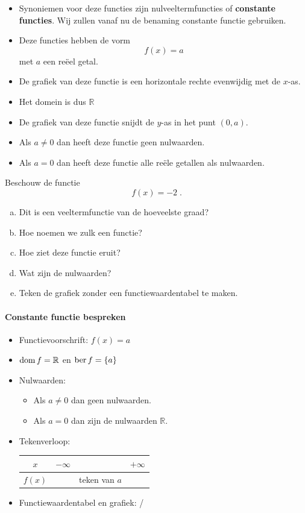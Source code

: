 \documentclass[12pt]{article}
\begin{document}
\begin{itemize}
\item Synoniemen voor deze functies zijn nulveeltermfuncties of {\bf constante functies}. Wij zullen vanaf nu de benaming constante functie gebruiken.
\item Deze functies hebben de vorm
  $$f(x) = a$$
  met $a$ een reëel getal.
\item De grafiek van deze functie is een horizontale rechte evenwijdig met de $x$-as.
\item Het domein is dus $\mathbb{R}$
\item De grafiek van deze functie snijdt de $y$-as in het punt $(0, a)$.
\item Als $a\neq 0$ dan heeft deze functie geen nulwaarden.
\item Als $a=0$ dan heeft deze functie alle reële getallen als nulwaarden.
\end{itemize}



\begin{oefening}
  Beschouw de functie
  $$f(x)=-2\;.$$
  \begin{enumerate}[(a)]
  \item Dit is een veeltermfunctie van de hoeveelste graad?
  \item Hoe noemen we zulk een functie?
  \item Hoe ziet deze functie eruit?
  \item Wat zijn de nulwaarden?
  \item Teken de grafiek zonder een functiewaardentabel te maken.
  \end{enumerate}
\end{oefening}



\paragraph*{Constante functie bespreken}
\begin{mdframed}
  \begin{itemize}
  \item Functievoorschrift: $f(x)=a$
  \item $\dom f = \mathbb{R}$ en $\ber f = \{a\}$
  \item Nulwaarden:
    \begin{itemize}
    \item Als $a\neq 0$ dan geen nulwaarden.
    \item Als $a=0$ dan zijn de nulwaarden $\mathbb{R}$.
    \end{itemize}
  \item Tekenverloop:
    \begin{center}
      \begin{tabular}{c|lcr}
        $x$ & $-\infty$ & & $+\infty$\\
        \hline
        $f(x)$ & & teken van $a$ &
      \end{tabular}
    \end{center}
  \item Functiewaardentabel en grafiek: /
  \end{itemize}
\end{mdframed}
\end{document}
